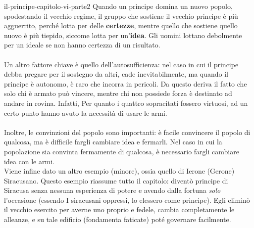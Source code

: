 \documentclass[preview]{standalone}
\begin{document}
\begin{snippet}{il-principe-capitolo-vi-parte2}
    Quando un principe domina un nuovo popolo, spodestando il vecchio regime,
    il gruppo che sostiene il vecchio principe è più agguerrito, perché lotta per delle \textbf{certezze},
    mentre quello che sostiene quello nuovo è più tiepido, siccome lotta per un'\textbf{idea}.
    Gli uomini lottano debolmente per un ideale se non hanno certezza di un risultato.
    \\\\
    Un altro fattore chiave è quello dell'autosufficienza:
    nel caso in cui il principe debba pregare per il sostegno da altri, cade inevitabilmente,
    ma quando il principe è autonomo, è raro che incorra in pericoli.
    Da questo deriva il fatto che solo chi è armato può vincere, mentre chi
    non possiede forza è destinato ad andare in rovina.
    Infatti, Per quanto i quattro sopracitati fossero virtuosi, ad un certo punto hanno avuto la necessità
    di usare le armi.
    \\\\
    Inoltre, le convinzioni del popolo sono importanti: è facile convincere il popolo di qualcosa,
    ma è difficile fargli cambiare idea e fermarli.
    Nel caso in cui la popolazione sia convinta fermamente di qualcosa, è necessario
    fargli cambiare idea con le armi.
    \\

    Viene infine dato un altro esempio (minore), ossia quello di Ierone (Gerone) Siracusano.
    Questo esempio riassume tutto il capitolo: diventò principe di Siracusa
    senza nessuna esperienza di potere e avendo dalla fortuna \textit{solo} l'occasione
    (essendo I siracusani oppressi, lo elessero come principe).
    Egli eliminò il vecchio esercito per averne uno proprio e fedele,
    cambia completamente le alleanze, e su tale edificio (fondamenta faticate) poté
    governare facilmente.
\end{snippet}
\end{document}
